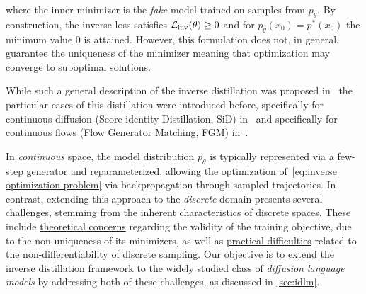   where the inner minimizer is the \emph{fake} model trained on samples from $p_\theta$. 
  By construction, the inverse loss satisfies $\mathcal{L}_{\text{inv}}(\theta) \geq 0$ and for $p_\theta(x_0) = p^*(x_0)$ the minimum value $0$ is attained. However, this formulation does not, in general, guarantee the uniqueness of the minimizer meaning that optimization may converge to suboptimal solutions.

  While such a general description of the inverse distillation was proposed in~\citep{kornilov2025universal} the particular cases of this distillation were introduced before, specifically for continuous diffusion (Score identity Distillation, SiD) in~\citep{zhou2024score} and specifically for continuous flows (Flow Generator Matching, FGM) in~\citep{huang2024flow}. 

    In \emph{continuous} space, the model distribution $p_\theta$ is typically represented via a few-step generator and reparameterized, allowing the optimization of~\eqref{eq:inverse optimization problem} via backpropagation through sampled trajectories. In contrast, extending this approach to the \emph{discrete} domain presents several challenges, stemming from the inherent characteristics of discrete spaces. These include \underline{theoretical concerns} regarding the validity of the training objective, due to the non-uniqueness of its minimizers, as well as \underline{practical difficulties} related to the non-differentiability of discrete sampling. Our objective is to extend the inverse distillation framework to the widely studied class of \emph{diffusion language models} by addressing both of these challenges, as discussed in \wasyparagraph\ref{sec:idlm}.
